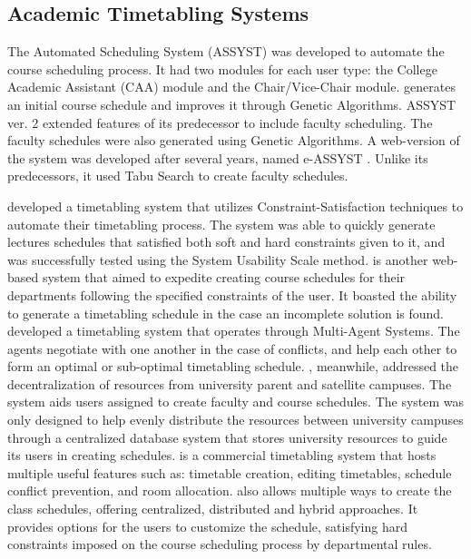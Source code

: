 \subsection{Academic Timetabling Systems}
The Automated Scheduling System (ASSYST) \cite{Assyst} was developed to automate the course scheduling process. It had two modules for each user type: the College Academic Assistant (CAA) module and the Chair/Vice-Chair module. \cite{Assyst} generates an initial course schedule and improves it through Genetic Algorithms. ASSYST ver. 2 \cite{Assyst2} extended features of its predecessor to include faculty scheduling. The faculty schedules were also generated using Genetic Algorithms. A web-version of the system was developed after several years, named e-ASSYST \cite{eAssyst}. Unlike its predecessors, it used Tabu Search to create faculty schedules. 

\cite{2013Nigeria} developed a timetabling system that utilizes Constraint-Satisfaction techniques to automate their timetabling process. The system was able to quickly generate lectures schedules that satisfied both soft and hard constraints given to it, and was successfully tested using the System Usability Scale method. \cite{UPM} is another web-based system that aimed to expedite creating course schedules for their departments following the specified constraints of the user. It boasted the ability to generate a timetabling schedule in the case an incomplete solution is found. \cite{Oprea2007} developed a timetabling system that operates through Multi-Agent Systems. The agents negotiate with one another in the case of conflicts, and help each other to form an optimal or sub-optimal timetabling schedule. \cite{bulacanState}, meanwhile, addressed the decentralization of resources from university parent and satellite campuses. The system aids users assigned to create faculty and course schedules. The system was only designed to help evenly distribute the resources between university campuses through a centralized database system that stores university resources to guide its users in creating schedules. \cite{UniTime} is a commercial timetabling system that hosts multiple useful features such as: timetable creation, editing timetables, schedule conflict prevention, and room allocation. \cite{UniTime} also allows multiple ways to create the class schedules, offering centralized, distributed and hybrid approaches. It provides options for the users to customize the schedule, satisfying hard constraints imposed on the course scheduling process by departmental rules.

